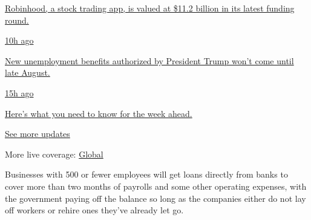 \href{https://www.nytimes3xbfgragh.onion/live/2020/08/17/business/stock-market-today-coronavirus?action=click\&pgtype=Article\&state=default\&region=MAIN_CONTENT_1\&context=storylines_live_updates\#robinhood-a-stock-trading-app-is-valued-at-11-2-billion-in-its-latest-funding-round}{Robinhood,
a stock trading app, is valued at \$11.2 billion in its latest funding
round.}

\href{https://www.nytimes3xbfgragh.onion/live/2020/08/17/business/stock-market-today-coronavirus?action=click\&pgtype=Article\&state=default\&region=MAIN_CONTENT_1\&context=storylines_live_updates\#new-unemployment-benefits-authorized-by-president-trump-wont-come-until-late-august}{10h
ago}

\href{https://www.nytimes3xbfgragh.onion/live/2020/08/17/business/stock-market-today-coronavirus?action=click\&pgtype=Article\&state=default\&region=MAIN_CONTENT_1\&context=storylines_live_updates\#new-unemployment-benefits-authorized-by-president-trump-wont-come-until-late-august}{New
unemployment benefits authorized by President Trump won't come until
late August.}

\href{https://www.nytimes3xbfgragh.onion/live/2020/08/17/business/stock-market-today-coronavirus?action=click\&pgtype=Article\&state=default\&region=MAIN_CONTENT_1\&context=storylines_live_updates\#heres-what-you-need-to-know-for-the-week-ahead}{15h
ago}

\href{https://www.nytimes3xbfgragh.onion/live/2020/08/17/business/stock-market-today-coronavirus?action=click\&pgtype=Article\&state=default\&region=MAIN_CONTENT_1\&context=storylines_live_updates\#heres-what-you-need-to-know-for-the-week-ahead}{Here's
what you need to know for the week ahead.}

\href{https://www.nytimes3xbfgragh.onion/live/2020/08/17/business/stock-market-today-coronavirus?action=click\&pgtype=Article\&state=default\&region=MAIN_CONTENT_1\&context=storylines_live_updates}{See
more updates}

More live coverage:
\href{https://www.nytimes3xbfgragh.onion/2020/08/17/world/coronavirus-covid.html?action=click\&pgtype=Article\&state=default\&region=MAIN_CONTENT_1\&context=storylines_live_updates}{Global}

Businesses with 500 or fewer employees will get loans directly from
banks to cover more than two months of payrolls and some other operating
expenses, with the government paying off the balance so long as the
companies either do not lay off workers or rehire ones they've already
let go.

